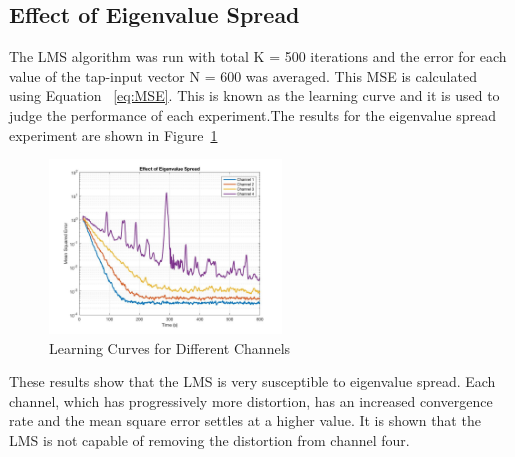 \documentclass[journal]{IEEEtran}
\begin{document}
\subsection{Effect of Eigenvalue Spread}
The LMS algorithm was run with total K = 500 iterations and the error for each value of the tap-input vector N = 600 was averaged.
This MSE is calculated using Equation ~\ref{eq:MSE}. This is known as the learning curve and it is used to judge the
performance of each experiment.The results for the eigenvalue spread experiment are shown in Figure~\ref{fig:eigenspread}
\begin{figure}[H]
  \centering
  \captionsetup{justification=centering}
  \includegraphics[width=0.55\textwidth, right] {Plots/Project1_Part1_2.jpg}
  \caption{Learning Curves for Different Channels}
    \label{fig:eigenspread}
\end{figure}
These results show that the LMS is very susceptible to eigenvalue spread. Each channel,
which has progressively more distortion, has an increased convergence rate and the mean square
error settles at a higher value. It is shown that the LMS is not capable of
removing the distortion from channel four.
\end{document}
